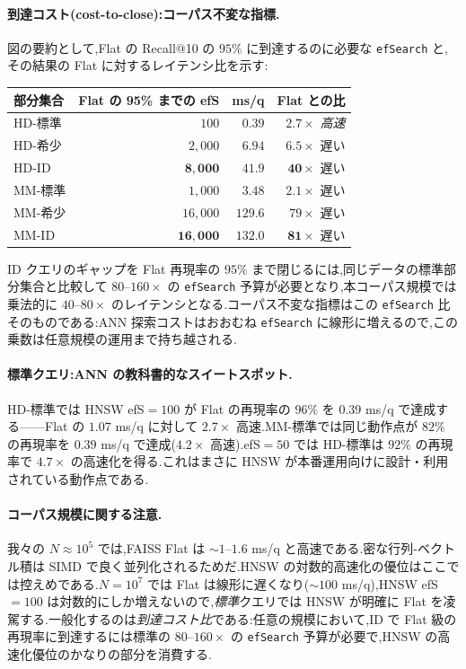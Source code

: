 \documentclass[conference]{IEEEtran}
\begin{document}
\paragraph{到達コスト(cost-to-close):コーパス不変な指標.}
図の要約として,Flat の Recall@10 の $95\%$ に到達するのに必要な \texttt{efSearch} と,その結果の Flat に対するレイテンシ比を示す:
\begin{center}\small
\setlength{\tabcolsep}{4pt}
\begin{tabular}{lrrr}
\toprule
部分集合 & Flat の 95\% までの efS & ms/q & Flat との比 \\
\midrule
HD-標準   & $100$    & $0.39$  & $2.7\times$ \emph{高速} \\
HD-希少   & $2{,}000$ & $6.94$  & $6.5\times$ 遅い \\
HD-ID     & $\mathbf{8{,}000}$ & $\mathbf{41.9}$ & $\mathbf{40\times}$ 遅い \\
MM-標準   & $1{,}000$ & $3.48$  & $2.1\times$ 遅い \\
MM-希少   & $16{,}000$ & $129.6$ & $79\times$ 遅い \\
MM-ID     & $\mathbf{16{,}000}$ & $\mathbf{132.0}$ & $\mathbf{81\times}$ 遅い \\
\bottomrule
\end{tabular}
\end{center}
ID クエリのギャップを Flat 再現率の $95\%$ まで閉じるには,同じデータの標準部分集合と比較して $80$--$160\times$ の \texttt{efSearch} 予算が必要となり,本コーパス規模では乗法的に $40$--$80\times$ のレイテンシとなる.コーパス不変な指標はこの \texttt{efSearch} 比そのものである:ANN 探索コストはおおむね \texttt{efSearch} に線形に増えるので,この乗数は任意規模の運用まで持ち越される.

\paragraph{標準クエリ:ANN の教科書的なスイートスポット.}
HD-標準では HNSW efS$=100$ が Flat の再現率の $96\%$ を $0.39$ ms/q で達成する——Flat の $1.07$ ms/q に対して $2.7\times$ 高速.MM-標準では同じ動作点が $82\%$ の再現率を $0.39$ ms/q で達成($4.2\times$ 高速).efS$=50$ では HD-標準は $92\%$ の再現率で $4.7\times$ の高速化を得る.これはまさに HNSW が本番運用向けに設計・利用されている動作点である.

\paragraph{コーパス規模に関する注意.}
我々の $N{\approx}10^5$ では,FAISS Flat は $\sim 1$--$1.6$ ms/q と高速である.密な行列-ベクトル積は SIMD で良く並列化されるためだ.HNSW の対数的高速化の優位はここでは控えめである.$N{=}10^7$ では Flat は線形に遅くなり(${\sim}100$ ms/q),HNSW efS$=100$ は対数的にしか増えないので,\emph{標準}クエリでは HNSW が明確に Flat を凌駕する.一般化するのは\emph{到達コスト比}である:任意の規模において,ID で Flat 級の再現率に到達するには標準の $80$--$160\times$ の \texttt{efSearch} 予算が必要で,HNSW の高速化優位のかなりの部分を消費する.
\end{document}

